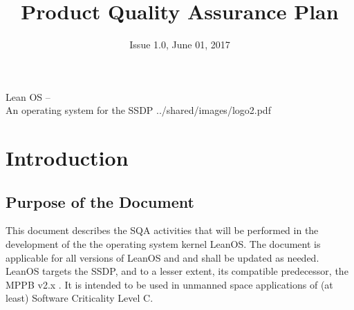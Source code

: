 

\title{Product Quality Assurance Plan}
\def \documentid {LEANOS-UVIE-PAQ-001}
\date{Issue 1.0, June 01, 2017}

\newcommand\affil[1]{\textsuperscript#1}

\def\preparedby {Armin Luntzer\affil{1}}
\def\checkedby {Roland Ottensamer\affil{1}}
\def\approvedby {Franz Kerschbaum\affil{1}}

\def\affiliations{
	\affil{1} Department of Astrophysics, University of Vienna
}








 
\usepackage{multicol}
\usepackage{enumitem}
\usepackage{vhistory}

\usepackage{biblatex}








\setmainfont{MyriadPro-SemiCondensed}
\uvietitlepage%
{Lean OS --\\ An operating system for the SSDP}%
{\doctitle}%
{../shared/images/logo2.pdf}
\setmainfont{MyriadPro}

\approvalpage

\tableofcontents
\newpage



\begin{versionhistory}
\end{versionhistory}


\chapter{Introduction}

\section{Purpose of the Document}


This document describes the \gls{SQA} activities that will be
performed in the development of the the operating system kernel LeanOS.
The document is applicable for all versions of LeanOS and and shall be updated
as needed.\\

\noindent
LeanOS targets the \gls{SSDP}, and to a lesser extent, its
compatible predecessor, the \gls{MPPB} v2.x \cite{MPPB}.
It is intended to be used in unmanned space applications of (at least)
Software Criticality Level C. \\

